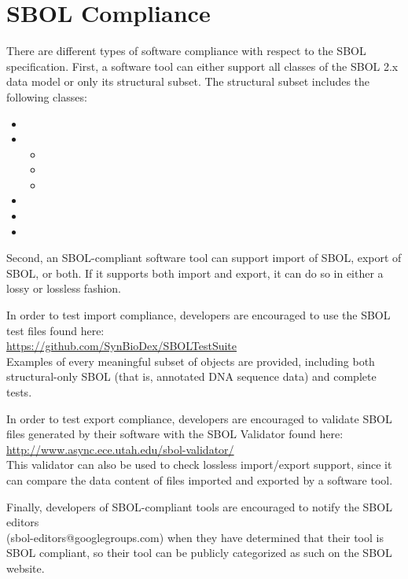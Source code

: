 \section{SBOL Compliance}

There are different types of software compliance with respect to the SBOL specification.  First, a software tool can either support all classes of the SBOL 2.x data model or only its structural subset.  The structural subset includes the following classes:
\begin{itemize}
\item {}
\item {}
\begin{itemize}
\item {}
\item {}
\item {}
\end{itemize}
\item {}
\item {}
\item {}
\end{itemize}
Second, an SBOL-compliant software tool can support import of SBOL, export of SBOL, or both.  
If it supports both import and export, it can do so in either a lossy or lossless fashion.

In order to test import compliance, developers are encouraged to use the SBOL test files found here:\\ {\url{https://github.com/SynBioDex/SBOLTestSuite}}\\
Examples of every meaningful subset of objects are provided, including both structural-only SBOL (that is, annotated DNA sequence data) and complete tests.  

In order to test export compliance, developers are encouraged to validate SBOL files generated by their software with the SBOL Validator found here:\\
\url{http://www.async.ece.utah.edu/sbol-validator/}\\
This validator can also be used to check lossless import/export support, since it can compare the data content of files imported and exported by a software tool.

Finally, developers of SBOL-compliant tools are encouraged to notify the SBOL editors\\(sbol-editors@googlegroups.com) when they have determined that their tool is SBOL compliant, so their tool can be publicly categorized as such on the SBOL website.


